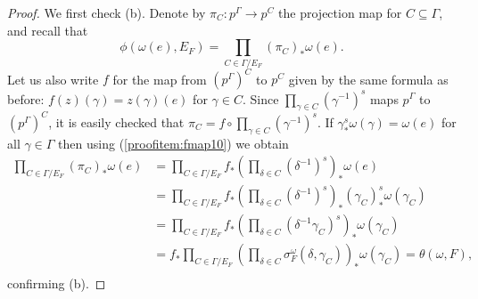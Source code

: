 \documentclass[12pt]{amsart}
\theoremstyle{definition}
\begin{document}
\begin{proof}
	We first check (b). Denote by $\pi_C : p^\Gamma \rightarrow p^C$ the projection map for $C \subseteq \Gamma$, and recall that
	\[\phi(\omega(e), E_F) = \prod_{C \in \Gamma / E_F} (\pi_C)_* \omega(e).\]
	Let us also write $f$ for the map from $(p^\Gamma)^C$ to $p^C$ given by the same formula as before: $f(z)(\gamma) = z(\gamma)(e)$ for $\gamma \in C$. Since $\prod_{\gamma \in C} (\gamma^{-1})^s$ maps $p^\Gamma$ to $(p^\Gamma)^C$, it is easily checked that $\pi_C = f \circ \prod_{\gamma \in C} (\gamma^{-1})^s$. If $\gamma^s_* \omega(\gamma) = \omega(e)$ for all $\gamma \in \Gamma$ then using (\ref{proofitem:fmap10}) we obtain
	\begin{align*}
		\prod_{C \in \Gamma / E_F} (\pi_C)_* \omega(e) & = \prod_{C \in \Gamma / E_F} f_* \left( \prod_{\delta \in C} (\delta^{-1})^s \right)_* \omega(e)\\
		& = \prod_{C \in \Gamma / E_F} f_* \left( \prod_{\delta \in C} (\delta^{-1})^s \right)_* (\gamma_C)^s_* \omega(\gamma_C)\\
		& = \prod_{C \in \Gamma / E_F} f_* \left( \prod_{\delta \in C} (\delta^{-1} \gamma_C)^s \right)_* \omega(\gamma_C)\\
		& = f_* \prod_{C \in \Gamma / E_F} \left( \prod_{\delta \in C} \sigma^\omega_F(\delta, \gamma_C) \right)_* \omega(\gamma_C) = \theta(\omega, F),\\
	\end{align*}
	confirming (b).
	

\end{proof}
\end{document}
